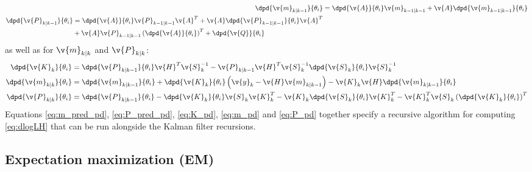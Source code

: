 \begin{align}
	\dpd{\v{m}_{k|k-1}}{\theta_i}&=\dpd{\v{A}}{\theta_i}\v{m}_{k-1|k-1}+\v{A}\dpd{\v{m}_{k-1|k-1}}{\theta_i} \label{eq:m_pred_pd}\\
	\begin{split}
	\dpd{\v{P}_{k|k-1}}{\theta_i}&=\dpd{\v{A}}{\theta_i}\v{P}_{k-1|k-1}\v{A}^T+\v{A}\dpd{\v{P}_{k-1|k-1}}{\theta_i}\v{A}^T\\
	&+\v{A}\v{P}_{k-1|k-1}\left(\dpd{\v{A}}{\theta_i}\right)^T+\dpd{\v{Q}}{\theta_i} \label{eq:P_pred_pd}
	\end{split}
\end{align}
as well as for $\v{m}_{k|k}$ and $\v{P}_{k|k}$:
\begin{align}
	\dpd{\v{K}_k}{\theta_i}&=\dpd{\v{P}_{k|k-1}}{\theta_i}\v{H}^T\v{S}_{k}^{-1}-\v{P}_{k|k-1}\v{H}^T\v{S}_{k}^{-1}\dpd{\v{S}_k}{\theta_i}\v{S}_{k}^{-1}
	\label{eq:K_pd}\\
	\dpd{\v{m}_{k|k}}{\theta_i}&=\dpd{\v{m}_{k|k-1}}{\theta_i}+\dpd{\v{K}_k}{\theta_i}\left(\v{y}_k-\v{H}\v{m}_{k|k-1}\right)-\v{K}_k\v{H}\dpd{\v{m}_{k|k-1}}{\theta_i}
	\label{eq:m_pd}\\
	\dpd{\v{P}_{k|k}}{\theta_i}&=\dpd{\v{P}_{k|k-1}}{\theta_i}-\dpd{\v{K}_k}{\theta_i}\v{S}_{k}\v{K}_{k}^T-\v{K}_{k}\dpd{\v{S}_k}{\theta_i}\v{K}_{k}^T-\v{K}_{k}^T\v{S}_{k}\left(\dpd{\v{K}_k}{\theta_i}\right)^T
	\label{eq:P_pd}
	\end{align}
Equations \eqref{eq:m_pred_pd}, \eqref{eq:P_pred_pd}, \eqref{eq:K_pd}, \eqref{eq:m_pd} and \eqref{eq:P_pd} together specify
a recursive algorithm for computing \eqref{eq:dlogLH} that can be run alongside the Kalman filter recursions.  

\subsection{Expectation maximization (EM)}

